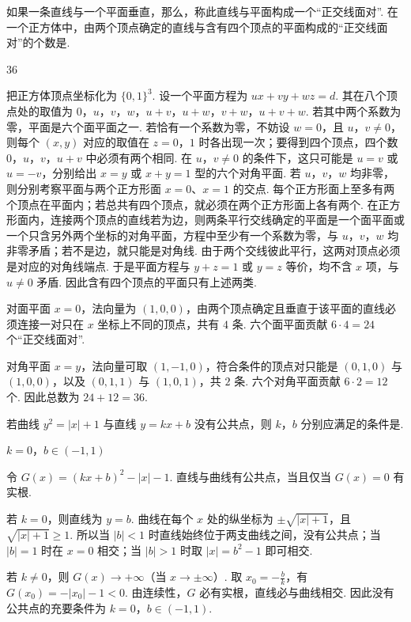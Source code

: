 \begin{problem}
如果一条直线与一个平面垂直，那么，称此直线与平面构成一个“正交线面对”. 在一个正方体中，由两个顶点确定的直线与含有四个顶点的平面构成的“正交线面对”的个数是\fillinblank{}.
\end{problem}

\begin{answer}
\(36\)
\end{answer}

\begin{solution}
把正方体顶点坐标化为 \(\{0,1\}^3\). 设一个平面方程为 \(ux+vy+wz=d\). 其在八个顶点处的取值为
\(0\)，\(u\)，\(v\)，\(w\)，\(u+v\)，\(u+w\)，\(v+w\)，\(u+v+w\). 若其中两个系数为零，平面是六个面平面之一. 若恰有一个系数为零，不妨设 \(w=0\)，且 \(u\)，\(v\neq0\)，则每个 \((x,y)\) 对应的取值在 \(z=0\)，\(1\) 时各出现一次；要得到四个顶点，四个数 \(0\)，\(u\)，\(v\)，\(u+v\) 中必须有两个相同. 在 \(u\)，\(v\neq0\) 的条件下，这只可能是 \(u=v\) 或 \(u=-v\)，分别给出 \(x=y\) 或 \(x+y=1\) 型的六个对角平面. 若 \(u\)，\(v\)，\(w\) 均非零，则分别考察平面与两个正方形面 \(x=0\)、\(x=1\) 的交点. 每个正方形面上至多有两个顶点在平面内；若总共有四个顶点，就必须在两个正方形面上各有两个. 在正方形面内，连接两个顶点的直线若为边，则两条平行交线确定的平面是一个面平面或一个只含另外两个坐标的对角平面，方程中至少有一个系数为零，与 \(u\)，\(v\)，\(w\) 均非零矛盾；若不是边，就只能是对角线. 由于两个交线彼此平行，这两对顶点必须是对应的对角线端点. 于是平面方程与 \(y+z=1\) 或 \(y=z\) 等价，均不含 \(x\) 项，与 \(u\neq0\) 矛盾. 因此含有四个顶点的平面只有上述两类.

对面平面 \(x=0\)，法向量为 \((1,0,0)\)，由两个顶点确定且垂直于该平面的直线必须连接一对只在 \(x\) 坐标上不同的顶点，共有 \(4\) 条. 六个面平面贡献 \(6\cdot4=24\) 个“正交线面对”.

对角平面 \(x=y\)，法向量可取 \((1,-1,0)\)，符合条件的顶点对只能是 \((0,1,0)\) 与 \((1,0,0)\)，以及 \((0,1,1)\) 与 \((1,0,1)\)，共 \(2\) 条. 六个对角平面贡献 \(6\cdot2=12\) 个. 因此总数为 \(24+12=36\).
\end{solution}

\begin{problem}
若曲线 \( y^{2} = |x| + 1 \) 与直线 \( y = kx + b \) 没有公共点，则 \(k\)，\(b\) 分别应满足的条件是\fillinblank{}.
\end{problem}

\begin{answer}
\(k=0\)，\(b\in(-1,1)\)
\end{answer}

\begin{solution}
令 \(G(x)=(kx+b)^2-|x|-1\). 直线与曲线有公共点，当且仅当 \(G(x)=0\) 有实根.

若 \(k=0\)，则直线为 \(y=b\). 曲线在每个 \(x\) 处的纵坐标为 \(\pm\sqrt{|x|+1}\)，且 \(\sqrt{|x|+1}\geq1\). 所以当 \(|b|<1\) 时直线始终位于两支曲线之间，没有公共点；当 \(|b|=1\) 时在 \(x=0\) 相交；当 \(|b|>1\) 时取 \(|x|=b^2-1\) 即可相交.

若 \(k\neq0\)，则 \(G(x)\to+\infty\)（当 \(x\to\pm\infty\)）. 取 \(x_0=-\frac{b}{k}\)，有 \(G(x_0)=-|x_0|-1<0\). 由连续性，\(G\) 必有实根，直线必与曲线相交. 因此没有公共点的充要条件为 \(k=0\)，\(b\in\left(-1,1\right)\).
\end{solution}

